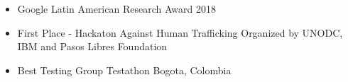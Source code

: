 
\begin{itemize}
    \item Google Latin American Research Award 2018
    \item First Place - Hackaton Against Human Trafficking Organized by UNODC, IBM and Pasos Libres Foundation
    \item Best Testing Group Testathon Bogota, Colombia
\end{itemize}







